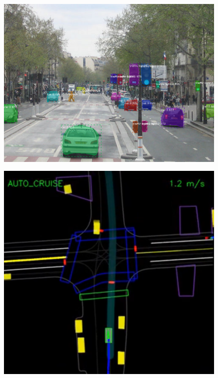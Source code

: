 \begin{frame}\frametitle<presentation>{\insertsubsection}
  \begin{figure}
    \centering
    \parbox{.4\linewidth}{
      \href{https://raw.githubusercontent.com/matterport/Mask_RCNN/master/assets/street.png}%
      {\includegraphics[width=\linewidth]{computer_vision}}
    }\hspace{0.1\linewidth}
    \parbox{.4\linewidth}{
      \href{https://sites.google.com/view/waymo-learn-to-drive/}%
      {\includegraphics[width=\linewidth]{planning}}
    }%
  \end{figure}
\end{frame}

